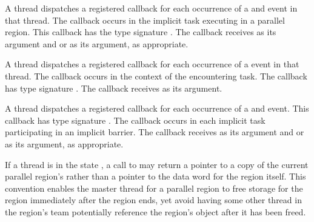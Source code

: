 \tools

A thread dispatches a registered 
callback for each occurrence of a  and
 event in that thread.  The callback occurs
in the implicit task executing in a parallel region.
This callback has the type signature
.  The callback receives
 as its  argument and
 or  as its
 argument, as appropriate.

A thread dispatches a registered 
callback for each occurrence of a  event in that thread.
The callback occurs in the context of the encountering task.  The
callback has type signature .  The
callback receives  as its 
argument.

A thread dispatches a registered
 callback for each occurrence
of a  and
 event.  This callback has type
signature .  The callback occurs
in each implicit task participating in an implicit barrier.  The
callback receives  as its 
argument and  or  as
its  argument, as appropriate.

\restrictions
If a thread is in the state ,
a call to 
may return a pointer to a copy of the current parallel region's 
rather than a pointer to the data word for the region itself. This convention enables the master thread
for a parallel region to free storage for the region immediately after the region ends, yet
avoid having some other thread in the region's team
potentially reference the region's  object after it has been freed. 

